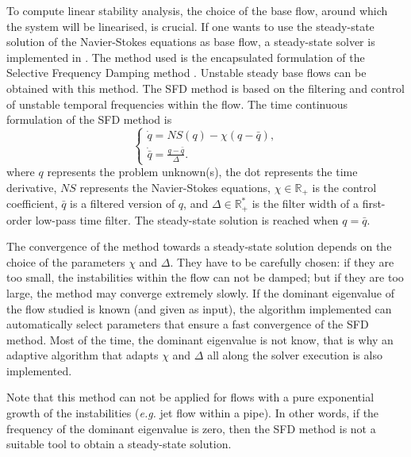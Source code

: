 To compute linear stability analysis, the choice of the base flow,
around which the system will be linearised, is crucial. If one wants
to use the steady-state solution of the Navier-Stokes equations as
base flow, a steady-state solver is implemented in \nekpp. The method
used is the encapsulated formulation of the Selective Frequency
Damping method \cite{JoCoSh14}. Unstable steady base flows can be
obtained with this method. The SFD method is based on the filtering
and control of unstable temporal frequencies within the flow. The time
continuous formulation of the SFD method is
\begin{equation}
\begin{cases}
\dot{q}=NS(q)-\chi (q-\bar{q}), \\
\dot{\bar{q}}=\frac{q-\bar{q}}{\Delta}.
\end{cases}
\label{SFD-General}
\end{equation}
where $q$ represents the problem unknown(s), the dot represents the time derivative, $NS$ represents the Navier-Stokes equations, $\chi \in \mathbb{R}_+$ is the control coefficient, $\bar{q}$ is a filtered version of $q$, and $\Delta \in \mathbb{R}_+ ^*$ is the filter width of a first-order low-pass time filter. The steady-state solution is reached when $q=\bar{q}$.

The convergence of the method towards a steady-state solution depends on the choice of the parameters $\chi$ and $\Delta$. They have to be carefully chosen: if they are too small, the instabilities within the flow can not be damped; but if they are too large, the method may converge extremely slowly. If the dominant eigenvalue of the flow studied is known (and given as input), the algorithm implemented can automatically select parameters that ensure a fast convergence of the SFD method. Most of the time, the dominant eigenvalue is not know, that is why an adaptive algorithm that adapts $\chi$ and $\Delta$ all along the solver execution is also implemented.

Note that this method can not be applied for flows with a pure exponential growth of the instabilities (\textit{e.g.} jet flow within a pipe). In other words, if the frequency of the dominant eigenvalue is zero, then the SFD method is not a suitable tool to obtain a steady-state solution.


